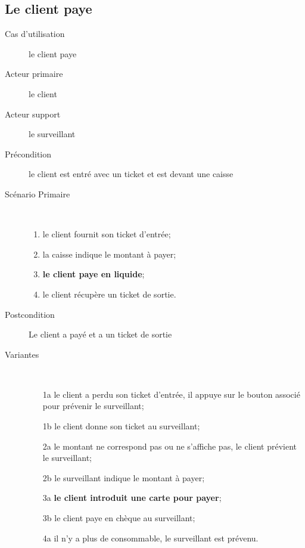 \documentclass[a4paper]{article}
\begin{document}
\subsection{Le client paye}
\begin{description}
	\item[Cas d'utilisation] le client paye
	\item[Acteur primaire] le client
	\item[Acteur support] le surveillant
	\item[Pr\'econdition] le client est entr\'e avec un ticket et est devant une caisse
	\item[Sc\'enario Primaire] \
	\begin{enumerate}
		\item le client fournit son ticket d'entr\'ee;
		\item la caisse indique le montant \`a payer;
		\item \textbf{le client paye en liquide};
		\item le client r\'ecup\`ere un ticket de sortie.
	\end{enumerate}
	\item[Postcondition] Le client a pay\'e et a un ticket de sortie
	\item[Variantes] \
	\begin{enumerate}
		\item[1a] le client a perdu son ticket d'entr\'ee, il appuye sur le
			bouton associ\'e pour pr\'evenir le surveillant;
		\item[1b] le client donne son ticket au surveillant;
		\item[2a] le montant ne correspond pas ou ne s'affiche pas, le client
			pr\'evient le surveillant;
		\item[2b] le surveillant indique le montant \`a payer;
		\item[3a] \textbf{le client introduit une carte pour payer};
		\item[3b] le client paye en ch\`eque au surveillant;
		\item[4a] il n'y a plus de consommable, le surveillant est pr\'evenu.
	\end{enumerate}
\end{description}
\end{document}
